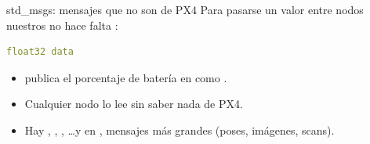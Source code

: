 \begin{frame}[fragile]{std\_msgs: mensajes que no son de PX4}
  \small Para pasarse un valor entre nodos nuestros no hace falta :
  \begin{lstlisting}[language=yaml,caption={ros2 interface show std\_msgs/msg/Float32}]
float32 data
  \end{lstlisting}
  \begin{itemize}
    \item {} publica el porcentaje de batería en  como
      .
    \item Cualquier nodo lo lee sin saber nada de PX4.
    \item Hay , , , \ldots y en ,
       mensajes más grandes (poses, imágenes, scans).
  \end{itemize}
\end{frame}
